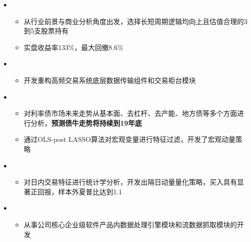   \begin{itemize}[leftmargin=*]
    \item
      {\small
      \begin{itemize}
        \item 从行业前景与商业分析角度出发，选择长短周期逻辑均向上且估值合理的3到5支股票持有
        \item 实盘收益率133\%，最大回撤8.6\%
      \end{itemize}
      }
    \item
      {\small
      \begin{itemize}
        \item 开发重构高频交易系统底层数据传输组件和交易柜台模块
      \end{itemize}
      }
    \item
      {\small
      \begin{itemize}
        \item 对利率债市场未来走势从基本面、去杠杆、去产能、地方债等多个方面进行分析，\textbf{预测债牛走势将持续到19年底}
        \item 通过OLS-post LASSO算法对宏观变量进行特征过滤，开发了宏观动量策略
      \end{itemize}
      }
    \item
      {\small
      \begin{itemize}
        \item 对日内交易特征进行统计学分析，开发出隔日动量量化策略，买入具有显著正回报，样本外夏普比达到1.1
      \end{itemize}
      }
    \item
      {\small
      \begin{itemize}
        \item 从事公司核心企业级软件产品内数据处理引擎模块和流数据抓取模块的开发
      \end{itemize}
      }
  \end{itemize}